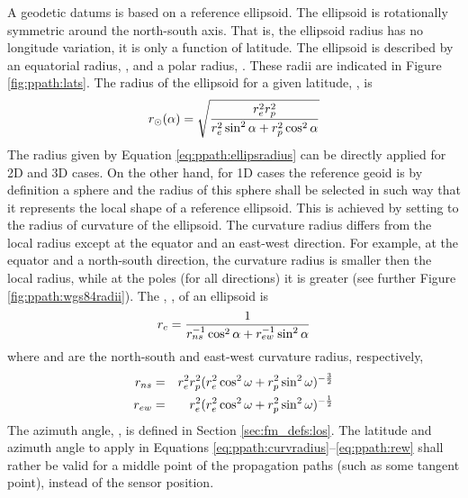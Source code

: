 A geodetic datums is based on a reference ellipsoid. The ellipsoid is rotationally symmetric around the
north-south axis. That is, the ellipsoid radius has no longitude
variation, it is only a function of latitude. The ellipsoid is
described by an equatorial radius, , and a polar radius,
. These radii are indicated in Figure \ref{fig:ppath:lats}.
The radius of the ellipsoid for a given latitude, \Lat, is
\begin{equation}
 r_{\odot}(\alpha) = \sqrt{\frac{r_{e}^2r_{p}^2}
                    {r_{e}^2\sin^2\alpha+r_{p}^2\cos^2\alpha}}
 \label{eq:ppath:ellipsradius} 
\end{equation}
The radius given by Equation \ref{eq:ppath:ellipsradius} can be
directly applied for 2D and 3D cases. On the other hand, for 1D cases
the reference geoid is by definition a sphere and the radius of this
sphere shall be selected in such way that it represents the local
shape of a reference ellipsoid. This is achieved by setting
\aRds{\odot} to the radius of curvature of the ellipsoid. The
curvature radius differs from the local radius except at the equator
and an east-west direction. For example, at the equator and a
north-south direction, the curvature radius is smaller then the local
radius, while at the poles (for all directions) it is greater (see
further Figure \ref{fig:ppath:wgs84radii}). 
The , , of an ellipsoid is 
\citep{rodgers:00}
\begin{equation}
 r_{c} = \frac{1}{r_{ns}^{-1}\cos^2 \alpha + r_{ew}^{-1}\sin^2 \alpha}
 \label{eq:ppath:curvradius} 
\end{equation}
where  and  are the north-south and east-west curvature radius, respectively,
\begin{eqnarray}
 r_{ns} &=& r_{e}^2r_{p}^2 (
           r_{e}^2\cos^2\omega+r_{p}^2\sin^2\omega )^{-\frac{3}{2}} \\
 r_{ew} &=& r_{e}^2 (
           r_{e}^2\cos^2\omega+r_{p}^2\sin^2\omega )^{-\frac{1}{2}} 
 \label{eq:ppath:rew} 
\end{eqnarray}
The azimuth angle, \AzmAng, is defined in
Section \ref{sec:fm_defs:los}. The latitude and azimuth angle to
apply in Equations \ref{eq:ppath:curvradius}--\ref{eq:ppath:rew}
shall rather be valid for a middle point of the propagation paths
(such as some tangent point), instead of the sensor position. 

